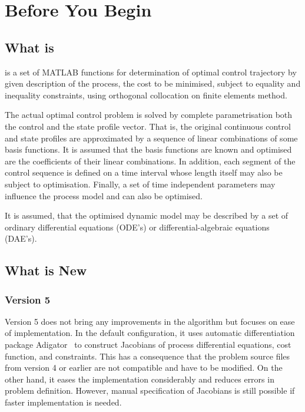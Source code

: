 \chapter{Before You Begin}
\label{cha:beforebegin}

\section{What is~}
\label{sec:whatisdynopt}

 is a set of MATLAB functions for determination of optimal
control trajectory by given description of the process, the cost to be
minimised, subject to equality and inequality constraints, using
orthogonal collocation on finite elements method. 

The actual optimal control problem is solved by complete
parametrisation both the control and the state profile vector. That
is, the original continuous control and state profiles are
approximated by a sequence of linear combinations of some basis
functions. It is assumed that the basis functions are known and
optimised are the coefficients of their linear combinations. In
addition, each segment of the control sequence is defined on a time
interval whose length itself may also be subject to
optimisation. Finally, a set of time independent parameters may
influence the process model and can also be optimised.

It is assumed, that the optimised dynamic model may be described by a
set of ordinary differential equations (ODE's) or
differential-algebraic equations (DAE's).

\section{What is New}
\label{sec:what-new-this}

\subsection*{Version 5}
Version 5 does not bring any improvements in the algorithm but focuses
on ease of implementation. In the default configuration, it uses
automatic differentiation package Adigator~\cite{wei17} to construct
Jacobians of process differential equations, cost function, and
constraints. This has a consequence that the problem source files from
version 4 or earlier are not compatible and have to be modified. On
the other hand, it eases the implementation considerably and reduces
errors in problem definition. However, manual specification of
Jacobians is still possible if faster implementation is needed.


